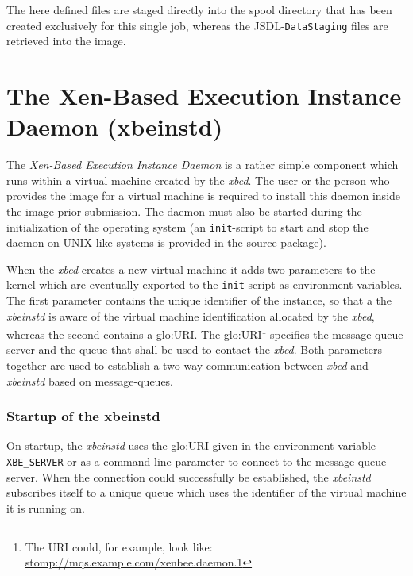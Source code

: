 The here defined  files are staged directly into  the spool directory that
has   been  created  exclusively   for  this   single  job,   whereas  the
JSDL-\texttt{DataStaging} files are retrieved into the image.

\section[The Xen-Based Execution Instance Daemon]{The Xen-Based Execution Instance Daemon (xbeinstd)}
\label{sec:xbeinstd}

The  \emph{Xen-Based  Execution  Instance   Daemon}  is  a  rather  simple
component   which  runs   within  a   virtual  machine   created   by  the
\emph{xbed}. The user  or the person who provides the  image for a virtual
machine  is  required  to  install  this daemon  inside  the  image  prior
submission. The daemon  must also be started during  the initialization of
the operating system (an \texttt{init}-script to start and stop the daemon
on UNIX-like systems is provided in the source package).

When the \emph{xbed} creates a  new virtual machine it adds two parameters
to the kernel which are eventually exported to the \texttt{init}-script as
environment variables.  The first parameter contains the unique identifier
of the  instance, so that  a the \emph{xbeinstd}  is aware of  the virtual
machine identification  allocated by  the \emph{xbed}, whereas  the second
contains a  \gls{glo:URI}.  The \gls{glo:URI}\footnote{The  URI could, for
  example,   look   like:   \url{stomp://mqs.example.com/xenbee.daemon.1}}
specifies the  message-queue server  and the queue  that shall be  used to
contact the \emph{xbed}. Both parameters  together are used to establish a
two-way  communication between  \emph{xbed} and  \emph{xbeinstd}  based on
message-queues.

\subsubsection{Startup of the xbeinstd}

On  startup,  the \emph{xbeinstd}  uses  the  \gls{glo:URI}  given in  the
environment variable  \texttt{XBE\_SERVER} or as a  command line parameter
to  connect  to  the  message-queue  server.  When  the  connection  could
successfully be  established, the  \emph{xbeinstd} subscribes itself  to a
unique  queue which  uses  the identifier  of  the virtual  machine it  is
running on.

